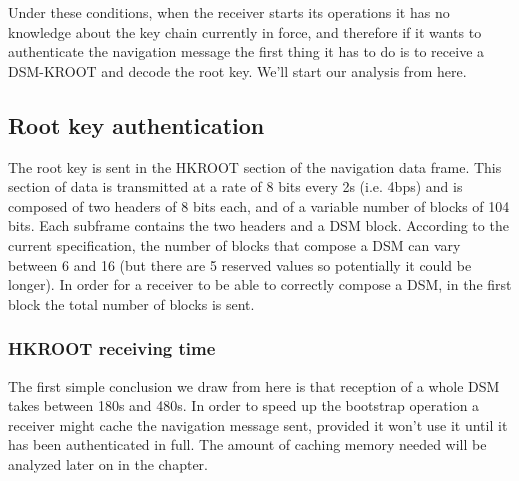 Under these conditions, when the receiver starts its operations it has no
knowledge about the key chain currently in force, and therefore if it wants to
authenticate the navigation message the first thing it has to do is to receive a
DSM-KROOT and decode the root key. We'll start our analysis from here.

\subsection{Root key authentication}
The root key is sent in the HKROOT section of the navigation data frame. This
section of data is transmitted at a rate of 8 bits every 2s (i.e. 4bps) and is
composed of two headers of 8 bits each, and of a variable number of blocks of
104 bits. Each subframe contains the two headers and a DSM block. According to
the current specification, the number of blocks that compose a DSM can vary
between 6 and 16 (but there are 5 reserved values so potentially it could be
longer). In order for a receiver to be able to correctly compose a DSM, in the
first block the total number of blocks is sent.

\subsubsection{HKROOT receiving time}
The first simple conclusion we draw from here is that reception of a whole DSM
takes between 180s and 480s. In order to speed up the bootstrap operation a
receiver might cache the navigation message sent, provided it won't use it until
it has been authenticated in full. The amount of caching memory needed will be
analyzed later on in the chapter.

